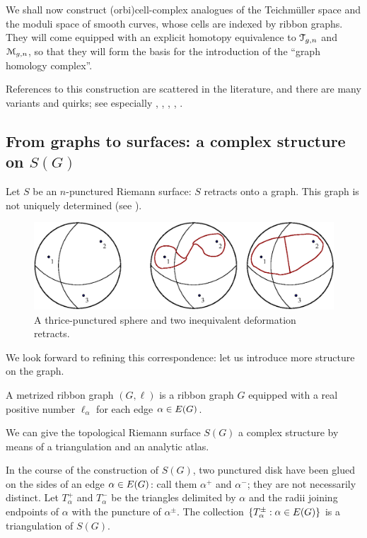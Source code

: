 We shall now construct (orbi)cell-complex analogues of the Teichm\"uller
space and the moduli space of smooth curves, whose cells are indexed
by ribbon graphs.  They will come equipped with an explicit homotopy
equivalence to $\mathcal{T}_{g,n}$ and $\mathcal{M}_{g,n}$, so that they will form the
basis for the introduction of the ``graph homology complex''.

References to this construction are scattered in the literature, and
there are many variants and quirks; see especially
\cite{harer;cohomology-of-moduli},
\cite{harer;cohomological-dimension},
\cite{kontsevich;intersection-theory;1992},
\cite{looijenga;cellular-decomposition},
\cite{penner:math.GT/0210326}.


\subsection{From graphs to surfaces: a complex structure on $S(G)$}
\label{sec:atlas}

Let $S$ be an $n$-punctured Riemann surface: $S$ retracts onto a
graph. This graph is not uniquely determined (see
).
\begin{figure}[bt]
  \centering\includegraphics[width=\textwidth]{sfera3}
  \caption{A thrice-punctured sphere and two inequivalent
    deformation retracts.} 
  \label{fig:sphere-retracts}
\end{figure}
We look forward to refining this correspondence: let us introduce more
structure on the graph.
\begin{definition}
  \label{dfn:metric-ribbon-graphs}
  A metrized ribbon graph $(G, \ell)$ is a ribbon graph $G$ equipped with
  a real positive number $\ell_\alpha$ for each edge $\alpha \in E(G)$.
\end{definition}

We can give the topological Riemann surface $S(G)$ a complex
structure by means of a triangulation and an analytic atlas.

In the course of the construction of $S(G)$, two punctured disk have
been glued on the sides of an edge $\alpha \in E(G)$: call them $\alpha^+$
and $\alpha^-$; they are not necessarily distinct.  Let $T_\alpha^+$ and $T_\alpha^-$
be the triangles delimited by $\alpha$ and the radii joining endpoints of
$\alpha$ with the puncture of $\alpha^\pm$. The collection $\{T_\alpha^\pm : \alpha \in
E(G)\}$ is a triangulation of $S(G)$.

